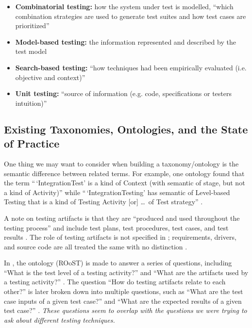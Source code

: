 \begin{itemize}
      \item \textbf{Combinatorial testing:} how the system under test is
            modelled, ``which combination strategies are used to generate test
            suites and how test cases are prioritized''
            \citep[pp.~1-2]{engström_mapping_2015}
      \item \textbf{Model-based testing:} the information represented and
            described by the test model \citep[p.~2]{engström_mapping_2015}
      \item \textbf{Search-based testing:} ``how techniques
             had been empirically evaluated
            (i.e. objective and context)'' \citep[p.~2]{engström_mapping_2015}
      \item \textbf{Unit testing:} ``source of information (e.g. code,
            specifications or testers intuition)''
            \citep[p.~2]{engström_mapping_2015}
\end{itemize}

\subsection{Existing Taxonomies, Ontologies, and the State of Practice}

One thing we may want to consider when building a taxonomy/ontology is the
semantic difference between related terms. For example, one ontology found
that the term ``\,`IntegrationTest' is a kind of Context (with
semantic of stage, but not a kind of Activity)'' while ``\,`IntegrationTesting'
has semantic of Level-based Testing that is a kind of Testing Activity [or]
\dots\ of Test strategy'' \citep[p.~157]{TebesEtAl2019}.

A note on testing artifacts is that they are ``produced and used throughout
the testing process'' and include test plans, test procedures, test cases, and
test results \citep[p.~3]{SouzaEtAl2017}. The role of testing
artifacts is not specified in \citep{BarbosaEtAl2006};
requirements, drivers, and source code are all treated the same
with no distinction \citep[p.~3]{BarbosaEtAl2006}.

In \citep{SouzaEtAl2017}, the ontology (ROoST)  is made to
answer a series of questions, including ``What is the test level of a testing
activity?'' and ``What are the artifacts used by a testing activity?''
\citep[pp.~8-9]{SouzaEtAl2017}. 
The question ``How do testing artifacts relate to each other?''
\citep[p.~8]{SouzaEtAl2017} is later broken down into multiple questions,
such as ``What are the test case inputs of a given test case?'' and ``What are
the expected results of a given test case?'' \citep[p.~21]{SouzaEtAl2017}.
\emph{These questions seem to overlap with the questions we were trying to ask
      about different testing techniques.}


